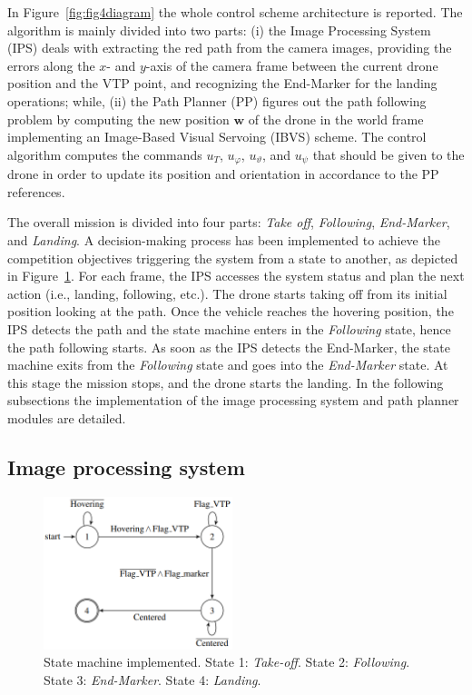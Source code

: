 \documentclass[a4paper,twocolumn,10pt]{article}
\begin{document}
    In Figure~\ref{fig:fig4diagram} the whole control scheme architecture is reported. The algorithm is mainly divided into two parts: (i) the Image Processing System (IPS) deals with extracting the red path from the 
    camera images, providing the errors along the $x$- and $y$-axis of the camera frame between the current drone position and the VTP point, and recognizing the End-Marker for the landing operations; while, (ii) the Path Planner (PP) figures out the path following problem by computing the new 
    position $\mathbf{w}$ of the drone in the world frame\cite[Sec.~V]{bibItem20} implementing 
    an Image-Based Visual Servoing (IBVS) scheme. The control algorithm computes the commands $u_T$, $u_\varphi$, $u_\vartheta$, and $u_\psi$ that should be given to the drone in order to update its position and orientation in accordance to the PP references. 

    The overall mission is divided into four parts: \textit{Take off}, \textit{Following}, \textit{End-Marker}, and \textit{Landing}. A decision-making process has been implemented to  achieve the competition objectives triggering the system from a state to another, as depicted in 
    Figure~\ref{fig:fig5stateMachine}. For each frame, the IPS accesses the system status and plan the next action (i.e., landing, following, etc.). The drone starts taking off from its initial position looking at the path. Once the vehicle reaches the hovering position, the IPS detects the path and the state machine enters in the \textit{Following} state, hence the path following starts. As soon as the IPS detects the End-Marker, the state machine exits from the \textit{Following} state and goes into the \textit{End-Marker} state. At this stage the mission stops, and the drone starts the landing. In the following subsections the implementation of the image processing system and path planner modules are detailed.

    \pagebreak
    \subsection{Image processing system}

    \begin{figure}
        \centering
        \includegraphics[width=0.49\textwidth]{pics/fig5_lines.png}
        \caption{State machine implemented. State 1: \textit{Take-off}. State 2: \textit{Following}. State 3: \textit{End-Marker}. State 4: \textit{Landing}.} 
        \label{fig:fig5stateMachine}
    \end{figure} 
\end{document}
